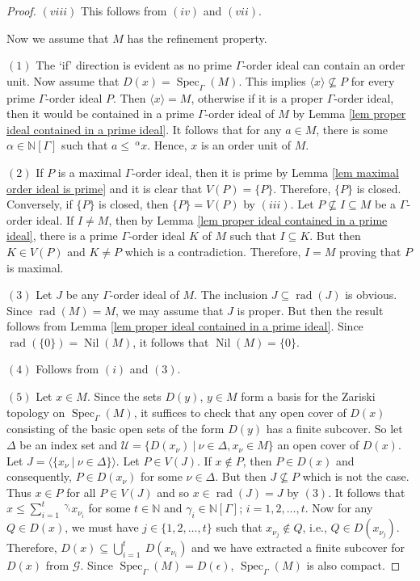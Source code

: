\documentclass[10pt,a4paper]{amsart}
\newcommand{\Spec}{\operatorname{Spec}}
\newcommand{\nil}{\operatorname{Nil}}
\newcommand{\rad}{\operatorname{rad}}
\begin{document}
\begin{proof}
$(viii)$ This follows from $(iv)$ and $(vii)$. 

Now we assume that $M$ has the refinement property.

$(1)$ The `if' direction is evident as no prime $\Gamma$-order ideal can contain an order unit. Now assume that $D(x)=\Spec_\Gamma(M)$. This implies $\langle x\rangle \nsubseteq P$ for every prime $\Gamma$-order ideal $P$. Then $\langle x\rangle=M$, otherwise if it is a proper $\Gamma$-order ideal, then it would be contained in a prime $\Gamma$-order ideal of $M$ by Lemma \ref{lem proper ideal contained in a prime ideal}. It follows that for any $a\in M$, there is some $\alpha\in \mathbb{N}[\Gamma]$ such that $a\le~^{\alpha}x$. Hence, $x$ is an order unit of $M$.

$(2)$ If $P$ is a maximal $\Gamma$-order ideal, then it is prime by Lemma \ref{lem maximal order ideal is prime} and it is clear that $V(P)=\{P\}$. Therefore, $\{P\}$ is closed. Conversely, if $\{P\}$ is closed, then $\{P\}=V(P)$ by $(iii)$. Let $P\nsubseteq I\subseteq M$ be a $\Gamma$-order ideal. If $I\neq M$, then by Lemma \ref{lem proper ideal contained in a prime ideal}, there is a prime $\Gamma$-order ideal $K$ of $M$ such that $I\subseteq K$. But then $K\in V(P)$ and $K\neq P$ which is a contradiction. Therefore, $I=M$ proving that $P$ is maximal. 

$(3)$ Let $J$ be any $\Gamma$-order ideal of $M$. The inclusion $J\subseteq \rad(J)$ is obvious. Since $\rad(M)=M$, we may assume that $J$ is proper. But then the result follows from Lemma \ref{lem proper ideal contained in a prime ideal}. Since $\rad(\{0\})=\nil(M)$, it follows that $\nil(M)=\{0\}$. 

$(4)$ Follows from $(i)$ and $(3)$.

$(5)$ Let $x\in M$. Since the sets $D(y)$, $y\in M$ form a basis for the Zariski topology on $\Spec_\Gamma(M)$, it suffices to check that any open cover of $D(x)$ consisting of the basic open sets of the form $D(y)$ has a finite subcover. So let $\Delta$ be an index set and $\mathcal{U}=\{D(x_\nu)~|~\nu\in \Delta,x_\nu\in M\}$ an open cover of $D(x)$. Let $J=\langle \{x_\nu~|~\nu\in \Delta\}\rangle$. Let $P\in V(J)$. If $x\notin P$, then $P\in D(x)$ and consequently, $P\in D(x_\nu)$ for some $\nu\in \Delta$. But then $J\nsubseteq P$ which is not the case. Thus $x\in P$ for all $P\in V(J)$ and so $x\in \rad(J)=J$ by $(3)$. It follows that $x\le \displaystyle{\sum_{i=1}^{t}}~^{\gamma_i}x_{\nu_i}$ for some $t\in \mathbb{N}$ and $\gamma_i\in \mathbb{N}[\Gamma]$; $i=1,2,\ldots,t$. Now for any $Q\in D(x)$, we must have $j\in \{1,2,\ldots,t\}$ such that $x_{\nu_j}\notin Q$, i.e., $Q\in D(x_{\nu_j})$. Therefore, $D(x)\subseteq \displaystyle{\bigcup_{i=1}^{t}}~D(x_{\nu_i})$ and we have extracted a finite subcover for $D(x)$ from $\mathcal{G}$. Since $\Spec_\Gamma(M)=D(\epsilon)$, $\Spec_\Gamma(M)$ is also compact.


\end{proof}
\end{document}
